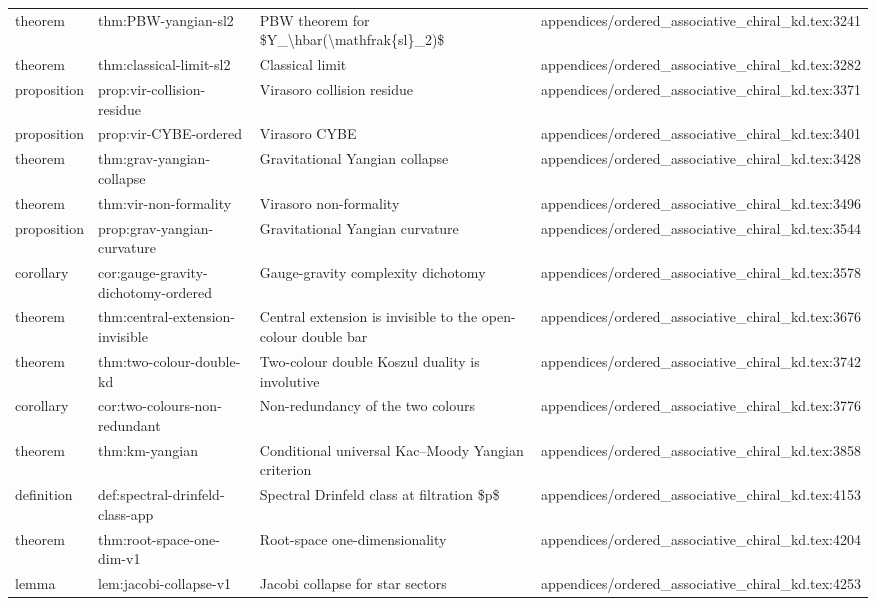 \documentclass[11pt]{article}
\begin{document}
\begin{longtable}{L{0.10\textwidth}L{0.26\textwidth}L{0.42\textwidth}L{0.22\textwidth}}
theorem & thm:PBW-yangian-sl2 & PBW theorem for \$Y\_\textbackslash{}hbar(\textbackslash{}mathfrak\{sl\}\_2)\$ & appendices/ordered\_associative\_chiral\_kd.tex:3241\\
theorem & thm:classical-limit-sl2 & Classical limit & appendices/ordered\_associative\_chiral\_kd.tex:3282\\
proposition & prop:vir-collision-residue & Virasoro collision residue & appendices/ordered\_associative\_chiral\_kd.tex:3371\\
proposition & prop:vir-CYBE-ordered & Virasoro CYBE & appendices/ordered\_associative\_chiral\_kd.tex:3401\\
theorem & thm:grav-yangian-collapse & Gravitational Yangian collapse & appendices/ordered\_associative\_chiral\_kd.tex:3428\\
theorem & thm:vir-non-formality & Virasoro non-formality & appendices/ordered\_associative\_chiral\_kd.tex:3496\\
proposition & prop:grav-yangian-curvature & Gravitational Yangian curvature & appendices/ordered\_associative\_chiral\_kd.tex:3544\\
corollary & cor:gauge-gravity-dichotomy-ordered & Gauge-gravity complexity dichotomy & appendices/ordered\_associative\_chiral\_kd.tex:3578\\
theorem & thm:central-extension-invisible & Central extension is invisible to the op{}en-colour double bar & appendices/ordered\_associative\_chiral\_kd.tex:3676\\
theorem & thm:two-colour-double-kd & Two-colour double Koszul duality is involutive & appendices/ordered\_associative\_chiral\_kd.tex:3742\\
corollary & cor:two-colours-non-redundant & Non-redundancy of the two colours & appendices/ordered\_associative\_chiral\_kd.tex:3776\\
theorem & thm:km-yangian & Cond{}itional universal Kac--Moody Yangian criterion & appendices/ordered\_associative\_chiral\_kd.tex:3858\\
definition & def:spectral-drinfeld-class-app & Spectral Drinfeld class at filtration \$p\$ & appendices/ordered\_associative\_chiral\_kd.tex:4153\\
theorem & thm:root-space-one-dim-v1 & Root-space one-dimensionality & appendices/ordered\_associative\_chiral\_kd.tex:4204\\
lemma & lem:jacobi-collapse-v1 & Jacobi collapse for star sectors & appendices/ordered\_associative\_chiral\_kd.tex:4253\\

\end{longtable}
\end{document}
